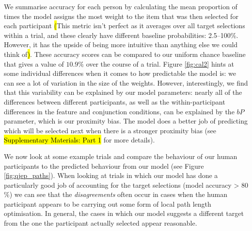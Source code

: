 \documentclass[vision,article,accept,pdftex,moreauthors]{Definitions/mdpi}
\begin{document}
\begin{figure}[H]

\label{fig:cal}
\end{figure}   

We summarise accuracy for each person by calculating the mean proportion of times the model assigns the most weight to the item that was then selected for each participant \hl{(}This metric isn't perfect as it averages over all target selections within a trial, and these clearly have different baseline probabilities: 2.5--100\%. However, it has the upside of being more intuitive than anything else we could think of\hl{)}. %
These accuracy scores can be compared to our uniform chance baseline that gives a value of $10.9\%$ over the course of a trial. Figure \ref{fig:cal2} hints at some individual differences when it comes to how predictable the model is: we can see a lot of variation in the size of the weights. However, interestingly, we find that this variability can be explained by our model parameters: nearly all of the differences between different participants, as well as the within-participant differences in the feature and conjunction conditions, can be explained by the $bP$ parameter, which is our proximity bias. The model does a better job of predicting which will be selected next when there is a stronger proximity bias (see {\hl{Supplementary Materials: Part 1}} for more details).



We now look at some example trials and compare the behaviour of our human participants to the predicted behaviour from our model (see Figure \ref{fig:qjep_paths}). When looking at trials in which our model has done a particularly good job of accounting for the target selections (model accuracy > 80$\%$) we can see that the \textit{disagreements} often occur in cases when the human participant appears to be carrying out some form of local path length optimisation. In general, the cases in which our model suggests a different target from the one the participant actually selected appear reasonable. 
\end{document}
